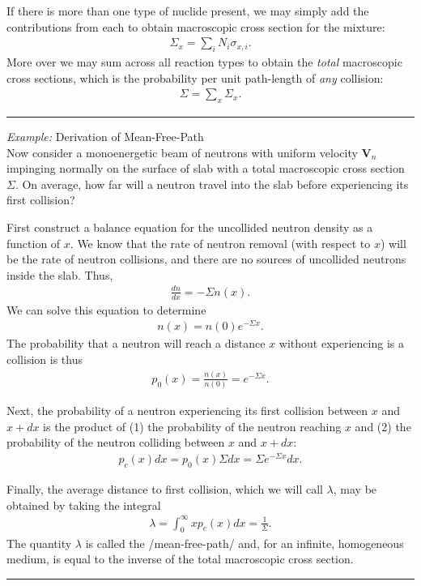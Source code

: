 \documentclass[11pt]{article}
\renewcommand\vec{\mathbf}
\newenvironment{example}[1]{\vspace{0.2in}\hrule\vspace{0.1in}\noindent\emph{Example:} #1 \\}{\vspace{0.1in}\hrule\vspace{0.2in}}
\begin{document}
If there is more than one type of nuclide present, we may simply add the contributions from each to obtain macroscopic cross section for the mixture:
\begin{align}
  \Sigma_x = \sum_i N_i \sigma_{x,i}.
\end{align}
More over we may sum across all reaction types to obtain the \emph{total} macroscopic cross sections, which is the probability per unit path-length of \emph{any} collision:
\begin{align}
  \Sigma = \sum_x \Sigma_x.
\end{align}

\begin{example}{Derivation of Mean-Free-Path}
Now consider a monoenergetic beam of neutrons with uniform velocity $\vec{V}_n$ impinging normally on the surface of slab with a total macroscopic cross section $\Sigma$.  On average, how far will a neutron travel into the slab before experiencing its first collision?

First construct a balance equation for the uncollided neutron density as a function of $x$.  We know that the rate of neutron removal (with respect to $x$) will be the rate of neutron collisions, and there are no sources of uncollided neutrons inside the slab.  Thus,
\begin{align}
  \frac{dn}{dx} = -\Sigma n(x).
\end{align}
We can solve this equation to determine
\begin{align}
  n(x) = n(0) e^{-\Sigma x}.
\end{align}
The probability that a neutron will reach a distance $x$ without experiencing is a collision is thus
\begin{align}
  p_0(x) = \frac{n(x)}{n(0)} = e^{-\Sigma x}.
\end{align}

Next, the probability of a neutron experiencing its first collision between $x$ and $x+dx$ is the product of (1) the probability of the neutron reaching $x$ and (2) the probability of the neutron colliding between $x$ and $x+dx$:
\begin{align}
  p_c(x)dx = p_0(x) \Sigma dx = \Sigma e^{-\Sigma x} dx.
\end{align}

Finally, the average distance to first collision, which we will call $\lambda$, may be obtained by taking the integral
\begin{align}
  \lambda = \int_0^\infty x p_c(x) dx = \frac{1}{\Sigma}.
\end{align}
The quantity $\lambda$ is called the /mean-free-path/ and, for an infinite, homogeneous medium, is equal to the inverse of the total macroscopic cross section.
\end{example}
\end{document}
